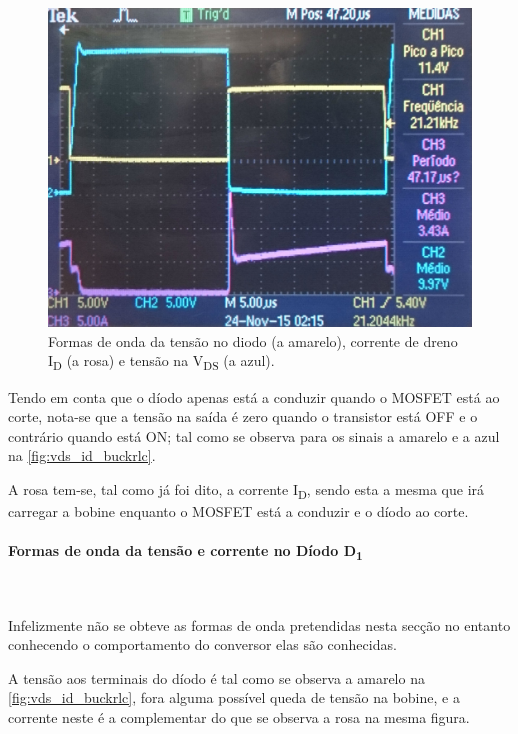 \documentclass[a4paper,11pt]{article}
\numberwithin{equation}{section}
\begin{document}
\begin{figure}[H]
	\centering
	\includegraphics[keepaspectratio=true, scale=0.17]{img/figs/vds_id_buckrlc}
	\caption{Formas de onda da tensão no diodo (a amarelo), corrente de dreno I\textsubscript{D} (a rosa) e tensão na V\textsubscript{DS} (a azul).}
	\label{fig:vds_id_buckrlc}
	\vspace{-0.8em}
\end{figure} 

Tendo em conta que o díodo apenas está a conduzir quando o MOSFET está ao corte, nota-se que a tensão na saída é zero quando o transistor está OFF e o contrário quando está ON; tal como se observa para os sinais a amarelo e a azul na \autoref{fig:vds_id_buckrlc}.

A rosa tem-se, tal como já foi dito, a corrente I\textsubscript{D}, sendo esta a mesma que irá carregar a bobine enquanto o MOSFET está a conduzir e o díodo ao corte.

\paragraph{Formas de onda da tensão e corrente no Díodo D\textsubscript{1}}\mbox{}\

Infelizmente não se obteve as formas de onda pretendidas nesta secção no entanto conhecendo o comportamento do conversor elas são conhecidas.

A tensão aos terminais do díodo é tal como se observa a amarelo na \autoref{fig:vds_id_buckrlc}, fora alguma possível queda de tensão na bobine, e a corrente neste é a complementar do que se observa a rosa na mesma figura.
\end{document}
